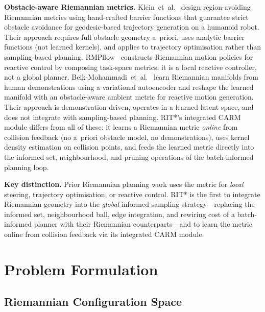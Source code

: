 \documentclass[journal]{IEEEtran}
\begin{document}
\textbf{Obstacle-aware Riemannian metrics.}
Klein~et~al.~\cite{Klein2023} design region-avoiding Riemannian metrics
using hand-crafted barrier functions that guarantee strict obstacle
avoidance for geodesic-based trajectory generation on a humanoid robot.
Their approach requires full obstacle geometry a~priori, uses analytic
barrier functions (not learned kernels), and applies to trajectory
optimisation rather than sampling-based planning.
RMPflow~\cite{Cheng2018rmpflow} constructs Riemannian motion policies
for reactive control by composing task-space metrics; it is a local
reactive controller, not a global planner.
Beik-Mohammadi~et~al.~\cite{BeikMohammadi2023} learn Riemannian
manifolds from human demonstrations using a variational autoencoder
and reshape the learned manifold with an obstacle-aware ambient metric
for reactive motion generation. Their approach is demonstration-driven,
operates in a learned latent space, and does not integrate with
sampling-based planning.
RIT*'s integrated CARM module differs from all of these: it learns a
Riemannian metric \emph{online} from collision feedback (no a~priori
obstacle model, no demonstrations), uses kernel density estimation on
collision points, and feeds the learned metric directly into the
informed set, neighbourhood, and pruning operations of the
batch-informed planning loop.

\textbf{Key distinction.}
Prior Riemannian planning work uses the metric for \emph{local}
steering, trajectory optimisation, or reactive control. RIT* is the
first to integrate Riemannian geometry into the \emph{global} informed
sampling strategy---replacing the informed set, neighbourhood ball,
edge integration, and rewiring cost of a batch-informed planner with
their Riemannian counterparts---and to learn the metric online from
collision feedback via its integrated CARM module.


\section{Problem Formulation}\label{sec:problem}

\subsection{Riemannian Configuration Space}
\end{document}
